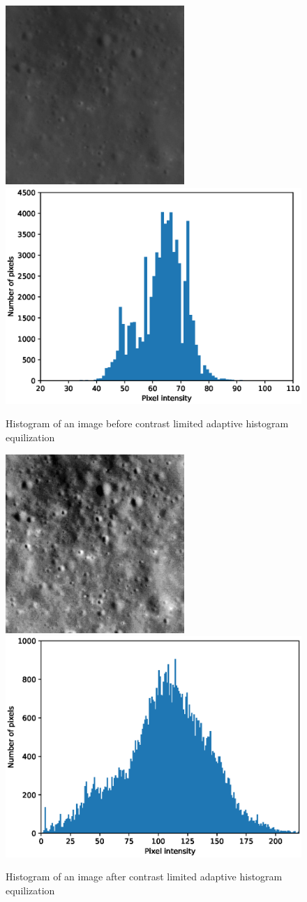 \documentclass[11pt]{article}
\begin{document}
\begin{figure}[ht!]
	\includegraphics[width=.4\textwidth]{files/unet/IMG-0.png}
	\includegraphics[width=.6\textwidth]{files/unet/0_hist.eps}
	\caption{Histogram of an image before contrast limited adaptive histogram equilization}
	\label{hist}
	\includegraphics[width=.4\textwidth]{files/unet/0_clahe.png}
	\includegraphics[width=.6\textwidth]{files/unet/0_hist_clahe.eps}
	\caption{Histogram of an image after contrast limited adaptive histogram equilization}
	\label{clahe}
\end{figure}
\end{document}
